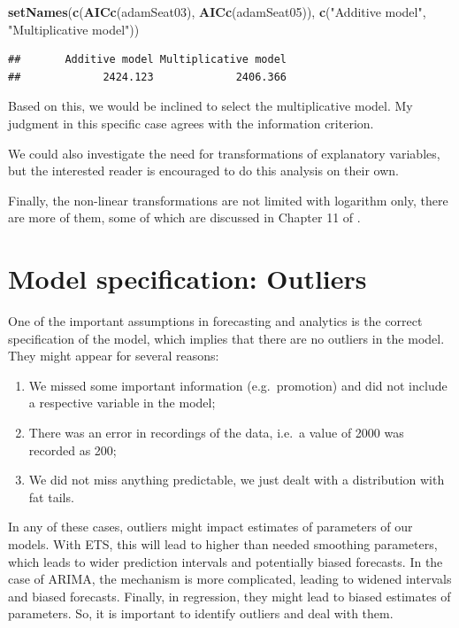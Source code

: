 \documentclass[]{book}
\newenvironment{Shaded}{\begin{snugshade}}{\end{snugshade}}
\newcommand{\KeywordTok}[1]{\textcolor[rgb]{0.13,0.29,0.53}{\textbf{#1}}}
\newcommand{\NormalTok}[1]{#1}
\newcommand{\StringTok}[1]{\textcolor[rgb]{0.31,0.60,0.02}{#1}}
\providecommand{\tightlist}{%
  \setlength{\itemsep}{0pt}\setlength{\parskip}{0pt}}
\theoremstyle{definition}
\theoremstyle{definition}
\theoremstyle{definition}
\theoremstyle{definition}
\theoremstyle{remark}
\begin{document}
\begin{Shaded}
\begin{Highlighting}[]
\KeywordTok{setNames}\NormalTok{(}\KeywordTok{c}\NormalTok{(}\KeywordTok{AICc}\NormalTok{(adamSeat03), }\KeywordTok{AICc}\NormalTok{(adamSeat05)),}
         \KeywordTok{c}\NormalTok{(}\StringTok{"Additive model"}\NormalTok{, }\StringTok{"Multiplicative model"}\NormalTok{))}
\end{Highlighting}
\end{Shaded}

\begin{verbatim}
##       Additive model Multiplicative model 
##             2424.123             2406.366
\end{verbatim}

Based on this, we would be inclined to select the multiplicative model. My judgment in this specific case agrees with the information criterion.

We could also investigate the need for transformations of explanatory variables, but the interested reader is encouraged to do this analysis on their own.

Finally, the non-linear transformations are not limited with logarithm only, there are more of them, some of which are discussed in Chapter 11 of \citet{SvetunkovSBA}.

\hypertarget{diagnosticsOutliers}{%
\section{Model specification: Outliers}\label{diagnosticsOutliers}}

One of the important assumptions in forecasting and analytics is the correct specification of the model, which implies that there are no outliers in the model. They might appear for several reasons:

\begin{enumerate}
\def\labelenumi{\arabic{enumi}.}
\tightlist
\item
  We missed some important information (e.g.~promotion) and did not include a respective variable in the model;
\item
  There was an error in recordings of the data, i.e.~a value of 2000 was recorded as 200;
\item
  We did not miss anything predictable, we just dealt with a distribution with fat tails.
\end{enumerate}

In any of these cases, outliers might impact estimates of parameters of our models. With ETS, this will lead to higher than needed smoothing parameters, which leads to wider prediction intervals and potentially biased forecasts. In the case of ARIMA, the mechanism is more complicated, leading to widened intervals and biased forecasts. Finally, in regression, they might lead to biased estimates of parameters. So, it is important to identify outliers and deal with them.
\end{document}
